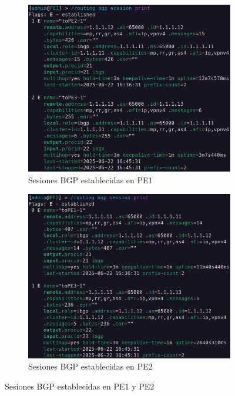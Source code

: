 \begin{figure}[H]
	\centering
	\begin{subfigure}[b]{0.475\textwidth}
		\centering
		\includegraphics[width=\textwidth]{images/PE1_bgp_print.png}
		\caption{Sesiones BGP establecidas en PE1}
		\label{fig:PE1_bgp_print}
	\end{subfigure}
	\hfill
	\begin{subfigure}[b]{0.482\textwidth}
		\centering
		\includegraphics[width=\textwidth]{images/PE2_bgp_print.png}
		\caption{Sesiones BGP establecidas en PE2}
		\label{fig:PE2_bgp_print}
	\end{subfigure}
	\caption{Sesiones BGP establecidas en PE1 y PE2}
	\label{fig:PE1_PE2_PE3_bgp_print}
\end{figure}

